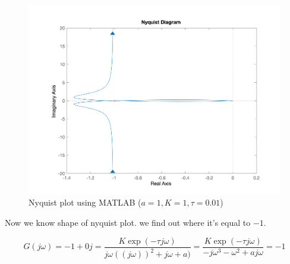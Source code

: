 \begin{figure}[H]
	\caption{Nyquist plot using MATLAB ($a = 1, K = 1, \tau = 0.01$)}
	\centering
	\includegraphics[width=12cm]{../Figure/Q3/MATLAB-Nyquist.png}
\end{figure}

Now we know shape of nyquist plot. we find out where it's equal to $-1$.

$$
G(j\omega) = -1 + 0j = \dfrac{K\exp(-\tau j\omega)}{j\omega((j\omega))^2 + j\omega + a)} = \dfrac{K\exp(-\tau j\omega)}{-j\omega^3 - \omega^2 + aj\omega} = -1
$$

